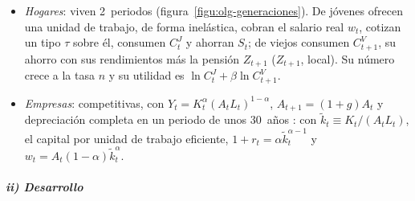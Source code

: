 \documentclass[11pt]{article}
\begin{document}
\begin{itemize}
\item \emph{Hogares}: viven 2~periodos (figura~\ref{figu:olg-generaciones}). De jóvenes ofrecen una unidad de trabajo, de forma inelástica, cobran el salario real $w_t$, cotizan un tipo $\tau$ sobre él, consumen $C^J_t$ y ahorran $S_t$; de viejos consumen $C^V_{t+1}$, su ahorro con sus rendimientos más la pensión $Z_{t+1}$ ($Z_{t+1}$, local). Su número crece a la tasa $n$ y su utilidad es $\ln C^J_t+\beta\ln C^V_{t+1}$.
\item \emph{Empresas}: competitivas, con $Y_t=K_t^{\alpha}(A_tL_t)^{1-\alpha}$, $A_{t+1}=(1+g)A_t$ y depreciación completa en un periodo de unos 30~años : con $\tilde k_t\equiv K_t/(A_tL_t)$, el capital por unidad de trabajo eficiente, $1+r_t=\alpha\tilde k_t^{\alpha-1}$ y $w_t=A_t(1-\alpha)\tilde k_t^{\alpha}$.
\end{itemize}

\begin{infografia}[H]
\centering
\caption{Generaciones solapadas: capitalización y reparto}\label{figu:olg-generaciones}
\end{infografia}

\subparagraph{ii) Desarrollo}
\end{document}
